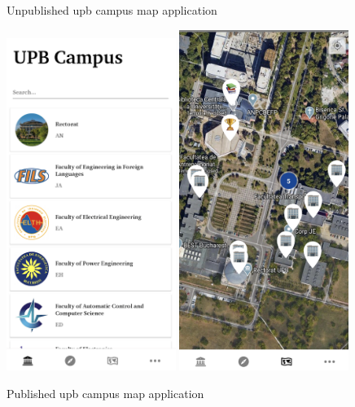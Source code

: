 \begin{figure}[!ht]
\begin{minipage}[b]{0.49\textwidth}
            \caption{Unpublished \acrshort{upb} campus map application}
            \label{2:fig:upb_campus_unpublished}
        \end{minipage}
        \hfill
        \begin{minipage}[b]{0.49\textwidth}
            \captionsetup{justification=centering}
             \includegraphics[width=0.49\textwidth]{figures/upb_apps/navigation/upb_campus_published1.png}
             \includegraphics[width=0.49\textwidth]{figures/upb_apps/navigation/upb_campus_published2.png}
            \caption{Published \acrshort{upb} campus map application}
            \label{2:fig:upb_campus_published}
        \end{minipage}
    \end{figure}
    
